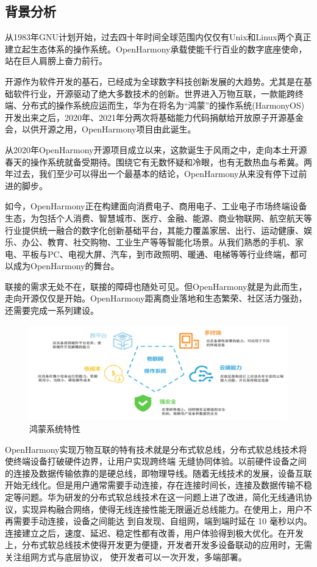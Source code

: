 \documentclass[12pt,a4paper]{ctexart}
\begin{document}
\subsection{背景分析}
从1983年GNU计划开始，过去四十年时间全球范围内仅仅有Unix和Linux两个真正建立起生态体系的操作系统。OpenHarmony承载使能千行百业的数字底座使命，站在巨人肩膀上奋力前行。\par
开源作为软件开发的基石，已经成为全球数字科技创新发展的大趋势。尤其是在基础软件行业，开源驱动了绝大多数技术的创新。世界进入万物互联，一款能跨终端、分布式的操作系统应运而生，华为在将名为“鸿蒙”的操作系统(HarmonyOS)开发出来之后，2020年、2021年分两次将基础能力代码捐献给开放原子开源基金会，以供开源之用，OpenHarmony项目由此诞生。\par
从2020年OpenHarmony开源项目成立以来，这款诞生于风雨之中，走向本土开源春天的操作系统就备受期待。围绕它有无数怀疑和冷眼，也有无数热血与希冀。两年过去，我们至少可以得出一个最基本的结论，OpenHarmony从来没有停下过前进的脚步。\par
如今，OpenHarmony正在构建面向消费电子、商用电子、工业电子市场终端设备生态，为包括个人消费、智慧城市、医疗、金融、能源、商业物联网、航空航天等行业提供统一融合的数字化创新基础平台，其能力覆盖家居、出行、运动健康、娱乐、办公、教育、社交购物、工业生产等等智能化场景。从我们熟悉的手机、家电、平板与PC、电视大屏、汽车，到市政照明、暖通、电梯等等行业终端，都可以成为OpenHarmony的舞台。\par
联接的需求无处不在，联接的障碍也随处可见。但OpenHarmony就是为此而生，走向开源仅仅是开始。OpenHarmony距离商业落地和生态繁荣、社区活力强劲，还需要完成一系列建设。
\begin{figure}[H]
\centering
\includegraphics[width=0.8\columnwidth]{./pic/11.png}
\caption{\small{鸿蒙系统特性}}
\end{figure}
OpenHarmony实现万物互联的特有技术就是分布式软总线，分布式软总线技术将使终端设备打破硬件边界，让用户实现跨终端 无缝协同体验。以前硬件设备之间的连接及数据传输依靠的是硬总线，即物理导线。随着无线技术的发展，设备互联开始无线化。但是用户通常需要手动连接，存在连接时间长，连接及数据传输不稳定等问题。华为研发的分布式软总线技术在这一问题上进了改进，简化无线通讯协议，实现异构融合网络，使得无线连接性能无限逼近总线能力。在使用上，用户不再需要手动连接，设备之间能达 到自发现、自组网，端到端时延在 10 毫秒以内。连接建立之后，速度、延迟、稳定性都有改善，用户体验得到极大优化。在开发上，分布式软总线技术使得开发更为便捷，开发者开发多设备联动的应用时，无需关注组网方式与底层协议， 使开发者可以一次开发，多端部署。
\end{document}
